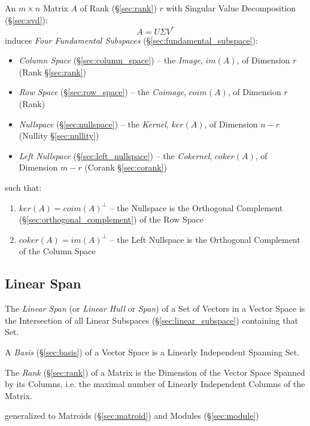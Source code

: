 An $m \times n$ Matrix $A$ of Rank (\S\ref{sec:rank}) $r$ with Singular
Value Decomposition (\S\ref{sec:svd}):
\[
  A = U \Sigma V^*
\]
induces \emph{Four Fundamental Subspaces} (\S\ref{sec:fundamental_subspace}):
\begin{itemize}
  \item \emph{Column Space} (\S\ref{sec:column_space}) -- the \emph{Image},
    $im(A)$, of Dimension $r$ (Rank \S\ref{sec:rank})
  \item \emph{Row Space} (\S\ref{sec:row_space}) -- the \emph{Coimage},
    $coim(A)$, of Dimension $r$ (Rank)
  \item \emph{Nullspace} (\S\ref{sec:nullspace}) -- the \emph{Kernel},
    $ker(A)$, of Dimension $n - r$ (Nullity \S\ref{sec:nullity})
  \item \emph{Left Nullspace} (\S\ref{sec:left_nullspace}) -- the
    \emph{Cokernel}, $coker(A)$, of Dimension $m - r$ (Corank
    \S\ref{sec:corank})
\end{itemize}
such that:
\begin{enumerate}
  \item $ker(A) = coim(A)^\bot$ -- the Nullspace is the Orthogonal Complement
    (\S\ref{sec:orthogonal_complement}) of the Row Space
  \item $coker(A) = im(A)^\bot$ -- the Left Nullspace is the Orthogonal
    Complement of the Column Space
\end{enumerate}



\subsection{Linear Span}\label{sec:linear_span}

The \emph{Linear Span} (or \emph{Linear Hull} or \emph{Span}) of a Set of
Vectors in a Vector Space is the Intersection of all Linear Subspaces
(\S\ref{sec:linear_subspace}) containing that Set.

A \emph{Basis} (\S\ref{sec:basis}) of a Vector Space is a Linearly Independent
Spanning Set.

The \emph{Rank} (\S\ref{sec:rank}) of a Matrix is the Dimension of the Vector
Space Spanned by its Columns, i.e. the maximal number of Linearly Independent
Columns of the Matrix.

generalized to Matroids (\S\ref{sec:matroid}) and Modules (\S\ref{sec:module})

